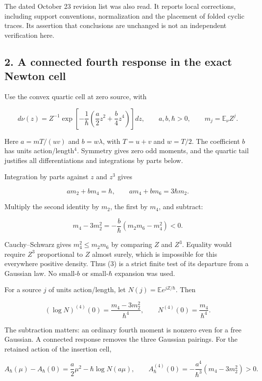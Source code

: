 \documentclass[11pt,a4paper]{article}
\begin{document}
The dated October 23 revision list was also read. It reports local
corrections, including support conventions, normalization and the
placement of folded cyclic traces. Its assertion that conclusions are
unchanged is not an independent verification here.

\subsection{2. A connected fourth response in the exact Newton
cell}\label{a-connected-fourth-response-in-the-exact-newton-cell}

Use the convex quartic cell at zero source, with

\[
 d\nu(z)=Z^{-1}\exp\left[-\frac1\hbar
                 \left(\frac a2z^2+\frac b4z^4\right)\right]dz,
 \qquad a,b,\hbar>0,
 \qquad m_j=\mathbb E_\nu Z^j.
 \tag{1}
\]

Here \(a=mT/(uv)\) and \(b=w\lambda\), with \(T=u+v\) and \(w=T/2\). The
coefficient \(b\) has units action/length\(^4\). Symmetry gives zero odd
moments, and the quartic tail justifies all differentiations and
integrations by parts below.

Integration by parts against \(z\) and \(z^3\) gives

\[
 a m_2+b m_4=\hbar,\qquad
 a m_4+b m_6=3\hbar m_2.
 \tag{2}
\]

Multiply the second identity by \(m_2\), the first by \(m_4\), and
subtract:

\[
 \boxed{\quad m_4-3m_2^2
       =-\frac b\hbar\left(m_2m_6-m_4^2\right)<0.\quad}
 \tag{3}
\]

Cauchy--Schwarz gives \(m_4^2\le m_2m_6\) by comparing \(Z\) and
\(Z^3\). Equality would require \(Z^3\) proportional to \(Z\) almost
surely, which is impossible for this everywhere positive density. Thus
(3) is a strict finite test of its departure from a Gaussian law. No
small-\(b\) or small-\(\hbar\) expansion was used.

For a source \(j\) of units action/length, let
\(N(j)=\mathbb E e^{jZ/\hbar}\). Then

\[
 (\log N)^{(4)}(0)=\frac{m_4-3m_2^2}{\hbar^4},\qquad
 N^{(4)}(0)=\frac{m_4}{\hbar^4}.
 \tag{4}
\]

The subtraction matters: an ordinary fourth moment is nonzero even for a
free Gaussian. A connected response removes the three Gaussian pairings.
For the retained action of the insertion cell,

\[
 A_\hbar(\mu)-A_\hbar(0)
    =\frac a2\mu^2-\hbar\log N(a\mu),\qquad
 A_\hbar^{(4)}(0)
    =-\frac{a^4}{\hbar^3}(m_4-3m_2^2)>0.
 \tag{5}
\]
\end{document}
